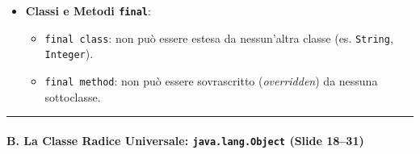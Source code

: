 \documentclass[11pt,a4paper]{article}
\newcommand{\passthrough}[1]{#1}
\providecommand{\tightlist}{\setlength{\itemsep}{0pt}\setlength{\parskip}{0pt}}
\begin{document}
\begin{itemize}
  \begin{itemize}
  \tightlist
  \item
    Attenzione: \textbf{I costruttori NON vengono mai ereditati dalle
    sottoclassi}.
  \item
    All'interno del costruttore di una sottoclasse, la prima istruzione
    deve essere una chiamata a \passthrough{\lstinline!super(...)!}
    oppure a un altro costruttore con
    \passthrough{\lstinline!this(...)!}.
  \item
    Se il programmatore non scrive nulla, il compilatore inserisce
    automaticamente \textbf{\passthrough{\lstinline!super();!}}
    (invocazione del costruttore vuoto della superclasse).
  \item
    Attenzione: \textbf{Trappola d'esame}: Se la superclasse non
    possiede un costruttore senza parametri (perché ne ha definito uno
    con parametri e non ha aggiunto quello di default), omettere
    \passthrough{\lstinline!super(...)!} genera un \textbf{Compile-Time
    Error}!
  \item
    \passthrough{\lstinline!super.metodo()!} permette inoltre di
    invocare l'implementazione originaria della superclasse, bypassando
    l'override locale.
  \end{itemize}
\item
  \textbf{Classi e Metodi \passthrough{\lstinline!final!}}:

  \begin{itemize}
  \tightlist
  \item
    \passthrough{\lstinline!final class!}: non può essere estesa da
    nessun'altra classe (es. \passthrough{\lstinline!String!},
    \passthrough{\lstinline!Integer!}).
  \item
    \passthrough{\lstinline!final method!}: non può essere sovrascritto
    (\emph{overridden}) da nessuna sottoclasse.
  \end{itemize}
\end{itemize}

\begin{center}\rule{0.5\linewidth}{0.5pt}\end{center}

\paragraph{\texorpdfstring{B. La Classe Radice Universale:
\texttt{java.lang.Object} (Slide
18--31)}{B. La Classe Radice Universale: java.lang.Object (Slide 18--31)}}\label{b.-la-classe-radice-universale-java.lang.object-slide-1831}
\end{document}
